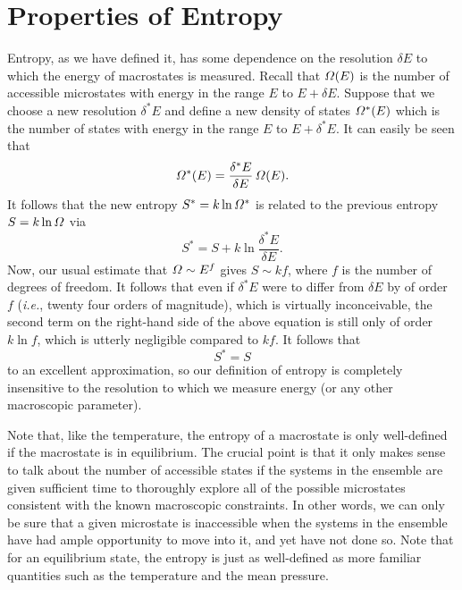 \section{Properties of Entropy}\label{s5.7}
Entropy, as we have defined it, has some dependence on the resolution $\delta E$
to which the energy of macrostates is measured. Recall that ${\mit\Omega}(E)$ is the
number of accessible microstates with energy in the range $E$ to $E+\delta E$. 
Suppose that we choose a new resolution $\delta^\ast E$ and define a new
density of states ${\mit\Omega}^\ast (E)$ which is the number of states with energy
in the range $E$ to $E+\delta^\ast E$. It can easily be seen that
\begin{equation}
{\mit\Omega}^\ast(E) = \frac{\delta^\ast E}{\delta E}\,{\mit\Omega}(E).
\end{equation}
It follows that the new entropy $S^\ast = k\ln{\mit\Omega}^\ast$ is related to the
previous entropy $S=k\ln {\mit\Omega}$ via
\begin{equation}
S^\ast = S + k \ln\frac{\delta^\ast E}{\delta E}.
\end{equation}
Now, our usual estimate that ${\mit\Omega} \sim E^f$ gives $S\sim kf$, where
$f$ is the number of degrees of freedom. It follows that even if $\delta^\ast E$
were to differ from $\delta E$ by of order $f$ ({\em i.e.}, twenty four orders of
magnitude), which is virtually inconceivable, the second term on the right-hand
side of the above equation is still only of order $k\ln f$, which is utterly
negligible compared to $kf$. It follows that
\begin{equation}
S^\ast = S
\end{equation}
to an excellent approximation, so our definition of entropy is completely
insensitive to the resolution to which we measure energy (or any other
macroscopic parameter).

Note that, like the 
temperature, the entropy of a macrostate is only well-defined if
the macrostate is in equilibrium. The crucial point is that
it only makes sense to talk about the
number of accessible states if the systems
in the ensemble are given sufficient time to thoroughly explore all of the possible
microstates consistent with the known
macroscopic constraints. In other words, we can only
be sure that a given microstate is inaccessible when the systems in the ensemble have
had ample opportunity to move into it, and yet  have not done so. Note that for an
equilibrium state, the entropy is just as well-defined as more familiar quantities
such as the temperature and the mean pressure.


